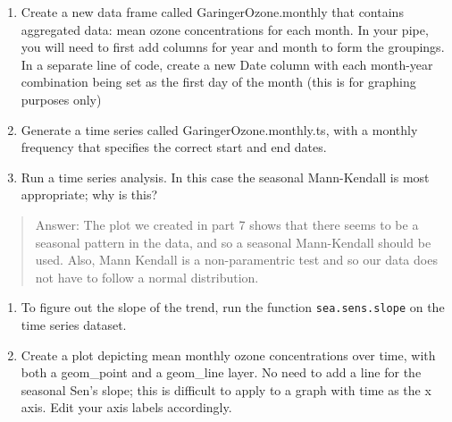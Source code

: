 \documentclass[
]{article}
\newenvironment{Shaded}{\begin{snugshade}}{\end{snugshade}}
\newcommand{\CommentTok}[1]{\textcolor[rgb]{0.56,0.35,0.01}{\textit{#1}}}
\newcommand{\FloatTok}[1]{\textcolor[rgb]{0.00,0.00,0.81}{#1}}
\newcommand{\KeywordTok}[1]{\textcolor[rgb]{0.13,0.29,0.53}{\textbf{#1}}}
\newcommand{\NormalTok}[1]{#1}
\newcommand{\OperatorTok}[1]{\textcolor[rgb]{0.81,0.36,0.00}{\textbf{#1}}}
\newcommand{\StringTok}[1]{\textcolor[rgb]{0.31,0.60,0.02}{#1}}
\begin{document}
\begin{enumerate}
\def\labelenumi{\arabic{enumi}.}
\setcounter{enumi}{8}
\item
  Create a new data frame called GaringerOzone.monthly that contains
  aggregated data: mean ozone concentrations for each month. In your
  pipe, you will need to first add columns for year and month to form
  the groupings. In a separate line of code, create a new Date column
  with each month-year combination being set as the first day of the
  month (this is for graphing purposes only)
\item
  Generate a time series called GaringerOzone.monthly.ts, with a monthly
  frequency that specifies the correct start and end dates.
\item
  Run a time series analysis. In this case the seasonal Mann-Kendall is
  most appropriate; why is this?
\end{enumerate}

\begin{quote}
Answer: The plot we created in part 7 shows that there seems to be a
seasonal pattern in the data, and so a seasonal Mann-Kendall should be
used. Also, Mann Kendall is a non-paramentric test and so our data does
not have to follow a normal distribution.
\end{quote}

\begin{enumerate}
\def\labelenumi{\arabic{enumi}.}
\setcounter{enumi}{11}
\item
  To figure out the slope of the trend, run the function
  \texttt{sea.sens.slope} on the time series dataset.
\item
  Create a plot depicting mean monthly ozone concentrations over time,
  with both a geom\_point and a geom\_line layer. No need to add a line
  for the seasonal Sen's slope; this is difficult to apply to a graph
  with time as the x axis. Edit your axis labels accordingly.
\end{enumerate}

\begin{Shaded}
\end{Shaded}
\end{document}
